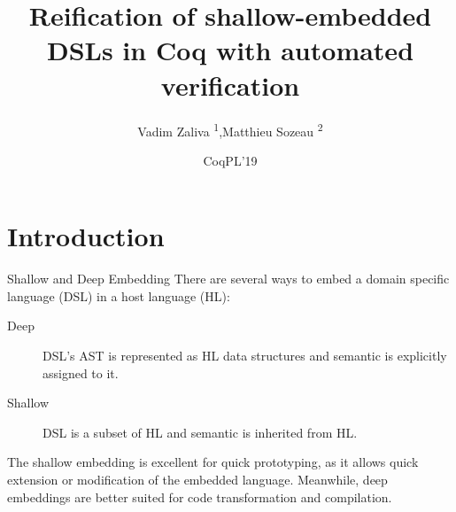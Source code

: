 \documentclass[aspectratio=169]{beamer}
\title{Reification of shallow-embedded DSLs in Coq with automated verification}
\author{Vadim Zaliva \textsuperscript{1},Matthieu Sozeau \textsuperscript{2}}
\institute[A]{\textsuperscript{1}Carnegie Mellon University\\ %
\textsuperscript{2}Inria \& IRIF, University Paris 7
}
\date{CoqPL'19}
\begin{document}
\begin{frame}
  \titlepage
\end{frame}

\section{Introduction}

\begin{frame}{Shallow and Deep Embedding}
  There are several ways to embed a domain specific language (DSL) in
  a host language (HL):
  \medskip
  \begin{description}
  \item[Deep] DSL's AST is represented as HL data structures and
    semantic is explicitly assigned to it.
  \item[Shallow] DSL is a subset of HL and semantic is inherited from HL.
  \end{description}

  \medskip
  The shallow embedding is excellent for quick prototyping, as it
  allows quick extension or modification of the embedded language.
  Meanwhile, deep embeddings are better suited for code transformation
  and compilation.
  
\end{frame}
\end{document}
